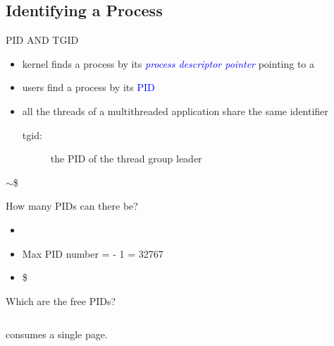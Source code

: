 \subsection{Identifying a Process}

\begin{frame}{PID AND TGID}
  \begin{itemize}
  \item kernel finds a process by its \textcolor{blue}{\emph{process descriptor pointer}}
    pointing to a 
  \item users find a process by its \textcolor{blue}{PID}
  \item all the threads of a multithreaded application share the same identifier
    \begin{description}
    \item[tgid:] the PID of the thread group leader
    \end{description}
  \end{itemize}
  \begin{center}
  \end{center}
  \begin{center}
    $\sim$\$ 
  \end{center}
\end{frame}


\begin{frame}[fragile]
  \begin{block}{How many PIDs can there be?}
    \begin{itemize}
    \item {}
    \item Max PID number =  - 1 = 32767
    \item \$ 
    \end{itemize}
  \end{block}
  \begin{block}{Which are the free PIDs?}
    \inputminted[fontsize=\small]{c}{../figs/pidmap-array.c}
     consumes a single page.
  \end{block}
\end{frame}


